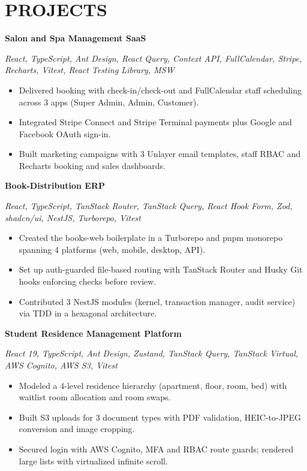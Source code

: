 \documentclass[10pt,a4paper]{article}
\newcommand{\entry}[2]{\textbf{#1}\hfill #2\par}
\newcommand{\stack}[1]{{\small\textit{#1}}\par}
\begin{document}
\section*{PROJECTS}
\entry{Salon and Spa Management SaaS}{}
\stack{React, TypeScript, Ant Design, React Query, Context API, FullCalendar, Stripe, Recharts, Vitest, React Testing Library, MSW}
\begin{itemize}
  \item Delivered booking with check-in/check-out and FullCalendar staff scheduling across 3 apps (Super Admin, Admin, Customer).
  \item Integrated Stripe Connect and Stripe Terminal payments plus Google and Facebook OAuth sign-in.
  \item Built marketing campaigns with 3 Unlayer email templates, staff RBAC and Recharts booking and sales dashboards.
\end{itemize}
\vspace{1pt}
\entry{Book-Distribution ERP}{}
\stack{React, TypeScript, TanStack Router, TanStack Query, React Hook Form, Zod, shadcn/ui, NestJS, Turborepo, Vitest}
\begin{itemize}
  \item Created the books-web boilerplate in a Turborepo and pnpm monorepo spanning 4 platforms (web, mobile, desktop, API).
  \item Set up auth-guarded file-based routing with TanStack Router and Husky Git hooks enforcing checks before review.
  \item Contributed 3 NestJS modules (kernel, transaction manager, audit service) via TDD in a hexagonal architecture.
\end{itemize}
\vspace{1pt}
\entry{Student Residence Management Platform}{}
\stack{React 19, TypeScript, Ant Design, Zustand, TanStack Query, TanStack Virtual, AWS Cognito, AWS S3, Vitest}
\begin{itemize}
  \item Modeled a 4-level residence hierarchy (apartment, floor, room, bed) with waitlist room allocation and room swaps.
  \item Built S3 uploads for 3 document types with PDF validation, HEIC-to-JPEG conversion and image cropping.
  \item Secured login with AWS Cognito, MFA and RBAC route guards; rendered large lists with virtualized infinite scroll.
\end{itemize}
\vspace{1pt}
\end{document}
